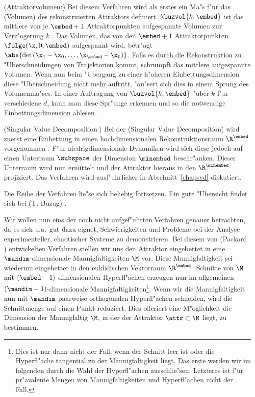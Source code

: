 \begin{myitemize}
\item \rem(Attraktorvolumen:) Bei diesem Verfahren wird als erstes ein Ma"s f"ur das
  \metapher(Volumen) des rekonstruierten Attraktors definiert. $\buzvol{k,\embed}$ ist das
  mittlere von je $\embed+1$ Attraktorpunkten aufgespannte Volumen zur Verz"ogerung $k$ .
  Das Volumen, das von den $\embed+1$ Attraktorpunkten $\folge(\x,0,\embed)$ aufgespannt
  wird, betr"agt $\abs{\det\left(\x_1-\x_0,\dots,\x_\embed-\x_0\right)}$.  Falls es durch die Rekonstruktion zu "Uberschneidungen von Trajektorien
  kommt, schrumpft das mittlere aufgespannte Volumen. Wenn nun beim "Ubergang zu einer h"oheren
  Einbettungsdimension diese "Uberschneidung nicht mehr auftritt, "au"sert sich dies in
  einem Sprung des Volumenma"ses. In einer Auftragung von $\buzvol{k,\embed}$ "uber $k$
  f"ur verschiedene $d$, kann man diese Spr"unge erkennen und  so
  die notwendige Einbettungsdimension ablesen \cite{Buzug90a} \cite{Buzug94}.
\item \rem(Singular Value Decomposition:) Bei der \begriff(Singular Value Decomposition)
  wird zuerst eine Einbettung in einen hochdimensionalen Rekonstruktionsraum $\R^\embed$
  vorgenommen \cite{Broomhead-king}. F"ur niedrigdimensionale Dynamiken wird sich diese
  jedoch auf einen Unterraum $\subspace$ der Dimension $\minembed$ beschr"anken. Dieser
  Unterraum wird nun ermittelt und der Attraktor hieraus in den $\R^\minembed$ projiziert.
  Das Verfahren wird ausf"uhrlicher in Abschnitt~\ref{chapsvd} diskutiert.
\end{myitemize}
Die Reihe der Verfahren lie"se sich beliebig fortsetzen. Ein gute "Ubersicht
findet sich bei \autor(T. Buzug) \cite{Buzug94}. 

Wir wollen nun eins der noch nicht
aufgef"uhrten Verfahren genauer betrachten, da es sich u.a.\  gut dazu eignet,
Schwierigkeiten und Probleme bei der Analyse experimenteller, chaotischer Systeme zu
demonstrieren. Bei diesem von \autor(Packard \etal) \cite{Packard80} entwickelten Verfahren stellen wir
uns den Attraktor eingebettet in eine $\mandim$-dimensionale Mannigfaltigkeiten $\M$ vor.
Diese Mannigfaltigkeit sei wiederum eingebettet in den euklidischen Vektorraum
$\R^\embed$.  Schnitte von $\M$ mit $(\embed-1)$-di\-men\-sio\-nalen Hyperfl"achen
erzeugen nun im allgemeinen $(\mandim-1)$-dimensionale Mannigfaltigkeiten\footnote{Dies
  ist nur dann nicht der Fall, wenn der Schnitt leer ist oder die Hyperfl"ache tangential
  zu der Mannigfaltigkeit liegt.  Das erste werden wir im folgenden durch die Wahl der
  Hyperfl"achen ausschlie"sen. Letzteres ist f"ur pr"avalente Mengen von
  Mannigfaltigkeiten und Hyperfl"achen nicht der Fall.}.  Wenn wir die
Mannigfaltigkeit nun mit $\mandim$ paarweise orthogonalen Hyperfl"achen schneiden, wird
die Schnittmenge auf einen Punkt reduziert. Dies offeriert eine M"oglichkeit die Dimension
der Mannigfaltig $\M$, in der der Attraktor $\attr\subset\M$ liegt, zu bestimmen.

